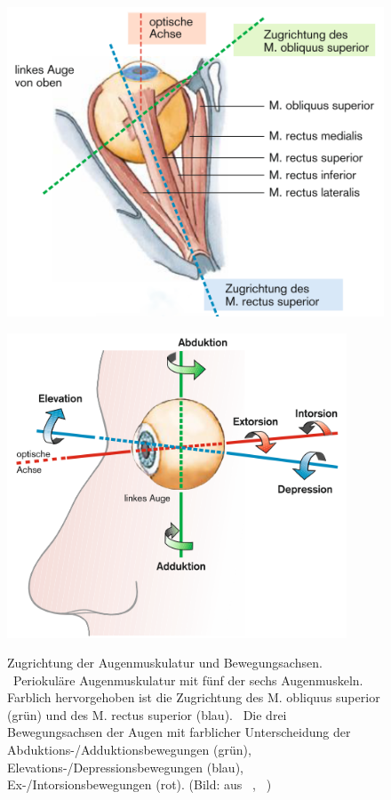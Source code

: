 \begin{figure}[ht]
   \begin{minipage}[t]{.5\linewidth} 
      \centering 
    \includegraphics[width=1\textwidth]{bilder/grundlagen/g5.png}
  \label{fig:zugrichtung} 
   \end{minipage}%
   \hfill
 	\begin{minipage}[t]{.5\linewidth} 
      \centering 
   \includegraphics[width=0.9\textwidth]{bilder/grundlagen/g4.png} 
  \label{fig:augenbewegung} 
   \end{minipage}%
   \caption{Zugrichtung der Augenmuskulatur und Bewegungsachsen. \textbf{}~Periokuläre Augenmuskulatur mit fünf der sechs Augenmuskeln. Farblich hervorgehoben ist die Zugrichtung des M. obliquus superior (grün) und des M. rectus superior (blau).  \textbf{}~Die drei Bewegungsachsen der Augen mit farblicher Unterscheidung der Abduktions-/Adduktionsbewegungen (grün), Elevations-/Depressionsbewegungen (blau), Ex-/Intorsionsbewegungen (rot). (Bild: aus \textbf{}~\cite[S.777]{Bondke2014}, \textbf{}~\cite[S.776]{Bondke2014})}\label{fig:augbilder} 
\end{figure} 

